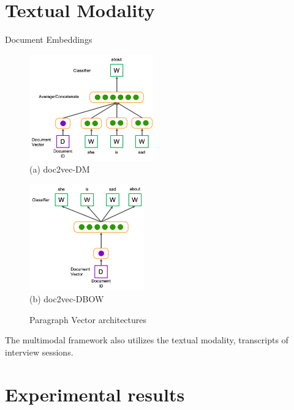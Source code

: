 \documentclass{beamer}
\begin{document}
\section{Textual Modality}

\begin{frame}{Document Embeddings}

\begin{figure}
    \centering
    \centering
    \begin{minipage}{0.55\textwidth}
        \centering
        \includegraphics[height=4.6cm]{images/doc2vec_dm-m.png} \\
        (a) doc2vec-DM
    \end{minipage}
    \begin{minipage}{0.43\textwidth}
        \centering
        \includegraphics[height=4.6cm]{images/doc2vec_dbow.png} \\
        (b) doc2vec-DBOW
    \end{minipage}
    \caption{Paragraph Vector architectures}
    \label{fig:doc2vec}
\end{figure}

The multimodal framework also utilizes the textual modality, transcripts of interview sessions.
    
\end{frame}


\section{Experimental results}
\end{document}
